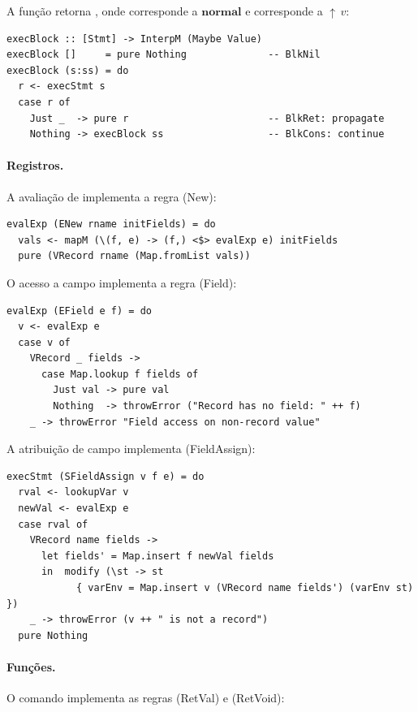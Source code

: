 A função  retorna ,
onde  corresponde a \(\mathbf{normal}\) e
 corresponde a \({\uparrow}\,v\):

\begin{verbatim}
execBlock :: [Stmt] -> InterpM (Maybe Value)
execBlock []     = pure Nothing              -- BlkNil
execBlock (s:ss) = do
  r <- execStmt s
  case r of
    Just _  -> pure r                        -- BlkRet: propagate
    Nothing -> execBlock ss                  -- BlkCons: continue
\end{verbatim}

\paragraph{Registros.}

A avaliação de  implementa a regra (New):

\begin{verbatim}
evalExp (ENew rname initFields) = do
  vals <- mapM (\(f, e) -> (f,) <$> evalExp e) initFields
  pure (VRecord rname (Map.fromList vals))
\end{verbatim}

O acesso a campo implementa a regra (Field):

\begin{verbatim}
evalExp (EField e f) = do
  v <- evalExp e
  case v of
    VRecord _ fields ->
      case Map.lookup f fields of
        Just val -> pure val
        Nothing  -> throwError ("Record has no field: " ++ f)
    _ -> throwError "Field access on non-record value"
\end{verbatim}

A atribuição de campo implementa (FieldAssign):

\begin{verbatim}
execStmt (SFieldAssign v f e) = do
  rval <- lookupVar v
  newVal <- evalExp e
  case rval of
    VRecord name fields ->
      let fields' = Map.insert f newVal fields
      in  modify (\st -> st
            { varEnv = Map.insert v (VRecord name fields') (varEnv st) })
    _ -> throwError (v ++ " is not a record")
  pure Nothing
\end{verbatim}

\paragraph{Funções.}

O comando  implementa as regras (RetVal) e (RetVoid):

